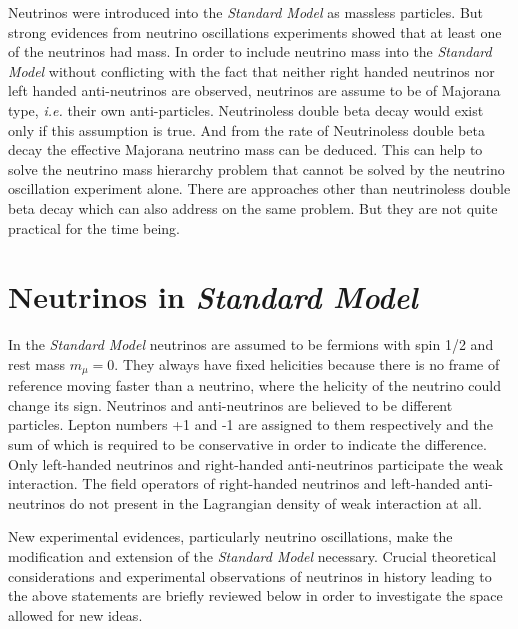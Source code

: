 Neutrinos were introduced into the \emph{Standard Model} as massless particles. But strong evidences from neutrino oscillations experiments showed that at least one of the neutrinos had mass. In order to include neutrino mass into the \emph{Standard Model} without conflicting with the fact that neither right handed neutrinos nor left handed anti-neutrinos are observed, neutrinos are assume to be of Majorana type, \textit{i.e.} their own anti-particles. Neutrinoless double beta decay would exist only if this assumption is true. And from the rate of Neutrinoless double beta decay the effective Majorana neutrino mass can be deduced. This can help to solve the neutrino mass hierarchy problem that cannot be solved by the neutrino oscillation experiment alone. There are approaches other than neutrinoless double beta decay which can also address on the same problem. But they are not quite practical for the time being.

\section{Neutrinos in \emph{Standard Model}}
\label{sec:sm}
In the \emph{Standard Model} neutrinos are assumed to be fermions with spin 1/2 and rest mass $m_\mu=0$. They always have fixed helicities because there is no frame of reference moving faster than a neutrino, where the helicity of the neutrino could change its sign. Neutrinos and anti-neutrinos are believed to be different particles. Lepton numbers +1 and -1 are assigned to them respectively and the sum of which is required to be conservative in order to indicate the difference. Only left-handed neutrinos and right-handed anti-neutrinos participate the weak interaction. The field operators of right-handed neutrinos and left-handed anti-neutrinos do not present in the Lagrangian density of weak interaction at all.

New experimental evidences, particularly neutrino oscillations, make the modification and extension of the \emph{Standard Model} necessary. Crucial theoretical considerations and experimental observations of neutrinos in history leading to the above statements are briefly reviewed below in order to investigate the space allowed for new ideas.

